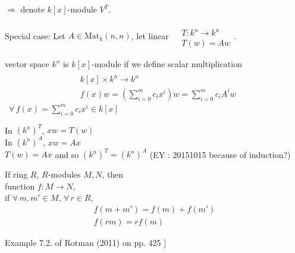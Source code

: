 \begin{enumerate}
	$\Longrightarrow $ denote $k[x]$-module $V^T$.  
	
	Special case: Let $A \in \text{Mat}_k(n,n)$, let linear $\begin{aligned} & \quad \\
	& T :k^n \to k^n \\
	& T(w) = Aw \end{aligned}$.  
	
	vector space $k^n$ is $k[x]$-module if we define scalar multiplication 
	\[
	\begin{aligned} & \quad \\
	& k[x] \times k^n \to k^n \\
	& f(x)w = \left( \sum_{i=0}^m c_ix^i \right)w = \sum_{i=0}^m c_i A^i w \end{aligned}
	\] 
	\quad \, $\forall \, f(x) = \sum_{i=0}^m c_ix^i \in k[x]$
	
	In $(k^n)^T$, $xw = T(w)$ \\
	In $(k^n)^A$, $xw = Ax $ \\
	$T(w) = Ax$ and so $(k^n)^T = (k^n)^A$  (EY : 20151015 because of induction?)
\end{enumerate}


\begin{definition}
If ring $R$, $R$-modules $M,N$, then \\
function $f: M\to N$, \\
if $\forall \, m, m' \in M$, $\forall \, r\in R$, 
\[
\begin{gathered}
	f(m+m') = f(m) + f(m') \\ 
f(rm) = rf(m)
\end{gathered}
\]
\end{definition}

Example 7.2. of Rotman (2011) on pp. 425 \cite{agat:JRotman2010}] 

